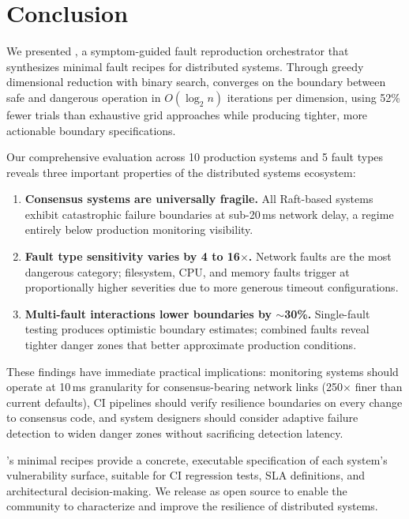 \section{Conclusion}
\label{sec:conclusion}

We presented \system{}, a symptom-guided fault reproduction orchestrator that
synthesizes minimal fault recipes for distributed systems. Through greedy
dimensional reduction with binary search, \system{} converges on the boundary
between safe and dangerous operation in $O(\log_2 n)$ iterations per
dimension, using 52\% fewer trials than exhaustive grid approaches while
producing tighter, more actionable boundary specifications.

Our comprehensive evaluation across 10 production systems and 5 fault types
reveals three important properties of the distributed systems ecosystem:

\begin{enumerate}[leftmargin=*,topsep=4pt,itemsep=2pt]
  \item \textbf{Consensus systems are universally fragile.} All Raft-based
        systems exhibit catastrophic failure boundaries at sub-20\,ms network
        delay, a regime entirely below production monitoring visibility.
  \item \textbf{Fault type sensitivity varies by 4 to 16$\times$.} Network faults
        are the most dangerous category; filesystem, CPU, and memory faults
        trigger at proportionally higher severities due to more generous
        timeout configurations.
  \item \textbf{Multi-fault interactions lower boundaries by $\sim$30\%.}
        Single-fault testing produces optimistic boundary estimates; combined
        faults reveal tighter danger zones that better approximate production
        conditions.
\end{enumerate}

These findings have immediate practical implications: monitoring systems should
operate at 10\,ms granularity for consensus-bearing network links (250$\times$
finer than current defaults), CI pipelines should verify resilience boundaries
on every change to consensus code, and system designers should consider adaptive
failure detection to widen danger zones without sacrificing detection latency.

\system{}'s minimal recipes provide a concrete, executable specification of
each system's vulnerability surface, suitable for CI regression tests, SLA
definitions, and architectural decision-making. We release \system{} as open
source to enable the community to characterize and improve the resilience of
distributed systems.

